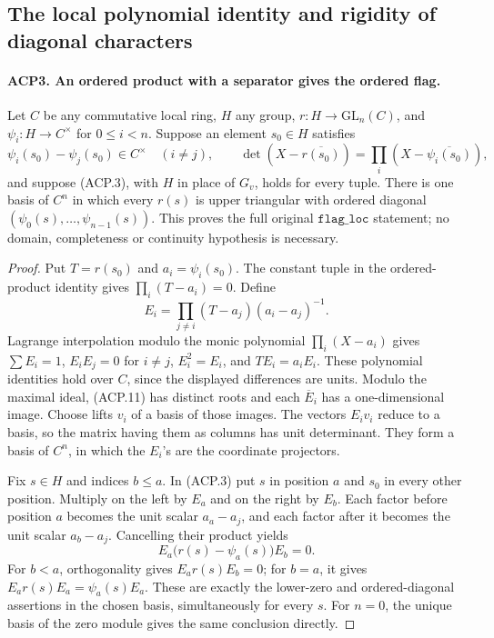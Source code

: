 \subsection{The local polynomial identity and rigidity of diagonal characters}

\paragraph{ACP3. An ordered product with a separator gives the ordered flag.}
\label{claim:ACP3}
Let \(C\) be any commutative local ring, \(H\) any group,
\(r:H\to\mathrm{GL}_n(C)\), and
\(\psi_i:H\to C^\times\) for \(0\le i<n\).
Suppose an element \(s_0\in H\) satisfies
\[
 \psi_i(s_0)-\psi_j(s_0)\in C^\times\quad(i\ne j),
 \qquad
 \det(X-\overline{r(s_0)})
       =\prod_i(X-\overline{\psi_i(s_0)}),
                                                        \tag{ACP.11}
\]
and suppose (ACP.3), with \(H\) in place of \(G_v\), holds
for every tuple.  There is one basis of \(C^n\) in which
every \(r(s)\) is upper triangular with ordered diagonal
\((\psi_0(s),\ldots,\psi_{n-1}(s))\).
This proves the full original \(\texttt{flag\_loc}\) statement;
no domain, completeness or continuity hypothesis is necessary.

\begin{proof}
Put \(T=r(s_0)\) and \(a_i=\psi_i(s_0)\).
The constant tuple in the ordered-product identity gives
\(\prod_i(T-a_i)=0\).  Define
\[
 E_i=\prod_{j\ne i}(T-a_j)(a_i-a_j)^{-1}.
                                                        \tag{ACP.12}
\]
Lagrange interpolation modulo the monic polynomial
\(\prod_i(X-a_i)\) gives
\(\sum E_i=1\), \(E_iE_j=0\) for \(i\ne j\),
\(E_i^2=E_i\), and \(TE_i=a_iE_i\).
These polynomial identities hold over \(C\), since the displayed
differences are units.  Modulo the maximal ideal, (ACP.11) has
distinct roots and each \(\overline E_i\) has a one-dimensional
image.  Choose lifts \(v_i\) of a basis of those images.
The vectors \(E_iv_i\) reduce to a basis, so the matrix having
them as columns has unit determinant.  They form a basis of
\(C^n\), in which the \(E_i\)'s are the coordinate projectors.

Fix \(s\in H\) and indices \(b\le a\).  In (ACP.3) put
\(s\) in position \(a\) and \(s_0\) in every other position.
Multiply on the left by \(E_a\) and on the right by \(E_b\).
Each factor before position \(a\) becomes the unit scalar
\(a_a-a_j\), and each factor after it becomes the unit scalar
\(a_b-a_j\).  Cancelling their product yields
\[
          E_a\bigl(r(s)-\psi_a(s)\bigr)E_b=0.
                                                        \tag{ACP.13}
\]
For \(b<a\), orthogonality gives \(E_ar(s)E_b=0\);
for \(b=a\), it gives \(E_ar(s)E_a=\psi_a(s)E_a\).
These are exactly the lower-zero and ordered-diagonal assertions
in the chosen basis, simultaneously for every \(s\).
For \(n=0\), the unique basis of the zero module gives the same
conclusion directly.
\end{proof}

